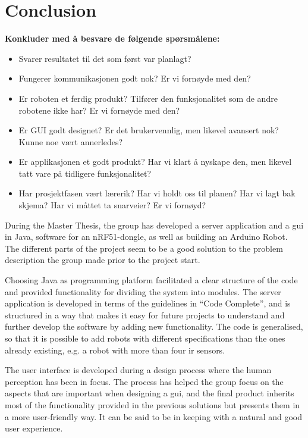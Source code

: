 \chapter{Conclusion}

\textbf{Konkluder med å besvare de følgende spørsmålene:}
\begin{itemize}
    \item Svarer resultatet til det som først var planlagt?
    \item Fungerer kommunikasjonen godt nok? Er vi fornøyde med den?
    \item Er roboten et ferdig produkt? Tilfører den funksjonalitet som de andre robotene ikke har? Er vi fornøyde med den?
    \item Er GUI godt designet? Er det brukervennlig, men likevel avansert nok? Kunne noe vært annerledes?
    \item Er applikasjonen et godt produkt? Har vi klart å nyskape den, men likevel tatt vare på tidligere funksjonalitet?
    \item Har prosjektfasen vært lærerik? Har vi holdt oss til planen? Har vi lagt bak skjema? Har vi måttet ta snarveier? Er vi fornøyd?
\end{itemize}

During the Master Thesis, the group has developed a server application and a \acrlong{gui} in Java, software for an nRF51-dongle, as well as building an Arduino Robot. The different parts of the project seem to be a good solution to the problem description the group made prior to the project start.

Choosing Java as programming platform facilitated a clear structure of the code and provided functionality for dividing the system into modules. The server application is developed in terms of the guidelines in ``Code Complete'', and is structured in a way that makes it easy for future projects to understand and further develop the software by adding new functionality. The code is generalised, so that it is possible to add robots with different specifications than the ones already existing, e.g. a robot with more than four \acrlong{ir} sensors.

The user interface is developed during a design process where the human perception has been in focus. The process has helped the group focus on the aspects that are important when designing a \acrshort{gui}, and the final product inherits most of the functionality provided in the previous solutions but presents them in a more user-friendly way. It can be said to be in keeping with a natural and good user experience.


